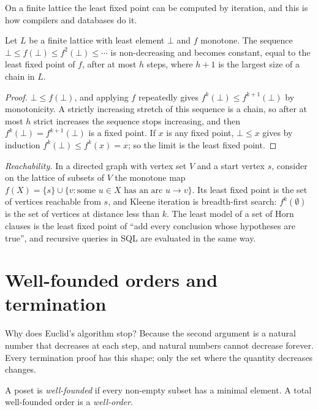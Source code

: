 On a finite lattice the least fixed point can be computed by iteration, and this is how compilers and databases do
it.

\begin{proposition}\label{orders:prop:kleene}
Let $L$ be a finite lattice with least element $\bot$ and $f$ monotone. The sequence $\bot\le f(\bot)\le f^2(\bot)\le\cdots$ is non-decreasing and
becomes constant, equal to the least fixed point of $f$, after at most $h$ steps, where $h+1$ is the largest size of a chain in $L$.
\end{proposition}
\begin{proof}
$\bot\le f(\bot)$, and applying $f$ repeatedly gives $f^k(\bot)\le f^{k+1}(\bot)$ by monotonicity. A strictly increasing stretch of this sequence
is a chain, so after at most $h$ strict increases the sequence stops increasing, and then $f^k(\bot)=f^{k+1}(\bot)$ is a fixed point. If $x$ is
any fixed point, $\bot\le x$ gives by induction $f^k(\bot)\le f^k(x)=x$; so the limit is the least fixed point.
\end{proof}

\begin{example}\label{orders:ex:reach}
\emph{Reachability.} In a directed graph with vertex set $V$ and a start vertex $s$, consider on the lattice of subsets of $V$ the
monotone map $f(X)=\{s\}\cup\{v:\text{some }u\in X\text{ has an arc }u\to v\}$. Its least fixed point is the set of vertices reachable from $s$, and Kleene
iteration is breadth-first search: $f^k(\emptyset)$ is the set of vertices at distance less than $k$. The least model of a set of Horn
clauses is the least fixed point of ``add every conclusion whose hypotheses are true'', and recursive
queries in SQL are evaluated in the same way.
\end{example}

\section{Well-founded orders and termination}

Why does Euclid's algorithm stop? Because the second argument is a natural number that decreases at each step, and
natural numbers cannot decrease forever. Every termination proof has this shape; only the set where the quantity
decreases changes.

\begin{definition}\label{orders:def:wf}
A poset is \emph{well-founded} if every non-empty subset has a minimal element. A total well-founded order is a
\emph{well-order}.
\end{definition}

